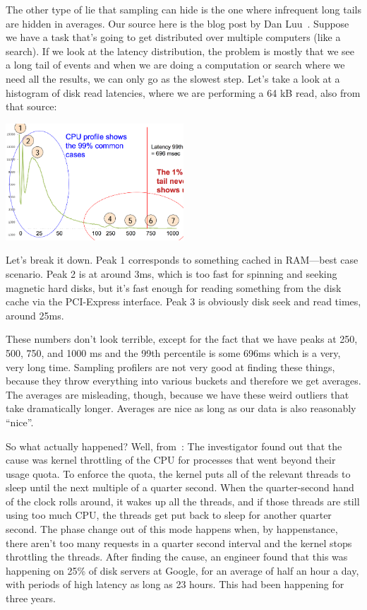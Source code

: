 \documentclass[a4paper]{report}
\begin{document}
The other type of lie that sampling can hide is the one where infrequent long tails are hidden in averages.
Our source here is the blog post by Dan Luu~\cite{perf-tracing}. Suppose we have a task that's going to get distributed over multiple computers (like a search). If we look at the latency distribution, the problem is mostly that we see a long tail of events and when we are doing a computation or search where we need all the results, we can only go as the slowest step. Let's take a look at a histogram of disk read latencies, where we are performing a 64 kB read, also from that source:

\begin{center}
	\includegraphics[width=0.5\textwidth]{images/disk_tail.png}
\end{center}

Let's break it down. Peak 1 corresponds to something cached in RAM---best case scenario. Peak 2 is at around 3ms, which is too fast for spinning and seeking magnetic hard disks, but it's fast enough for reading something from the disk cache via the PCI-Express interface. Peak 3 is obviously disk seek and read times, around 25ms. 

These numbers don't look terrible, except for the fact that we have peaks at 250, 500, 750, and 1000 ms and the 99th percentile is some 696ms which is a very, very long time. Sampling profilers are not very good at finding these things, because they throw everything into various buckets and therefore we get averages. The averages are misleading, though, because we have these weird outliers that take dramatically longer. Averages are nice as long as our data is also reasonably ``nice''.

So what actually happened? Well, from~\cite{perf-tracing}: The investigator found out that the cause was kernel throttling of the CPU for processes that went beyond their usage quota. To enforce the quota, the kernel puts all of the relevant threads to sleep until the next multiple of a quarter second. When the quarter-second hand of the clock rolls around, it wakes up all the threads, and if those threads are still using too much CPU, the threads get put back to sleep for another quarter second. The phase change out of this mode happens when, by happenstance, there aren't too many requests in a quarter second interval and the kernel stops throttling the threads. After finding the cause, an engineer found that this was happening on 25\% of disk servers at Google, for an average of half an hour a day, with periods of high latency as long as 23 hours. This had been happening for three years.
\end{document}

